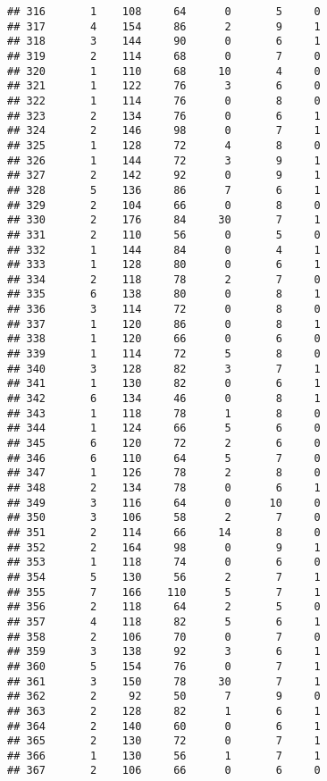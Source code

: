 \documentclass[
]{article}
\begin{document}
\begin{verbatim}
## 316       1    108     64      0       5     0
## 317       4    154     86      2       9     1
## 318       3    144     90      0       6     1
## 319       2    114     68      0       7     0
## 320       1    110     68     10       4     0
## 321       1    122     76      3       6     0
## 322       1    114     76      0       8     0
## 323       2    134     76      0       6     1
## 324       2    146     98      0       7     1
## 325       1    128     72      4       8     0
## 326       1    144     72      3       9     1
## 327       2    142     92      0       9     1
## 328       5    136     86      7       6     1
## 329       2    104     66      0       8     0
## 330       2    176     84     30       7     1
## 331       2    110     56      0       5     0
## 332       1    144     84      0       4     1
## 333       1    128     80      0       6     1
## 334       2    118     78      2       7     0
## 335       6    138     80      0       8     1
## 336       3    114     72      0       8     0
## 337       1    120     86      0       8     1
## 338       1    120     66      0       6     0
## 339       1    114     72      5       8     0
## 340       3    128     82      3       7     1
## 341       1    130     82      0       6     1
## 342       6    134     46      0       8     1
## 343       1    118     78      1       8     0
## 344       1    124     66      5       6     0
## 345       6    120     72      2       6     0
## 346       6    110     64      5       7     0
## 347       1    126     78      2       8     0
## 348       2    134     78      0       6     1
## 349       3    116     64      0      10     0
## 350       3    106     58      2       7     0
## 351       2    114     66     14       8     0
## 352       2    164     98      0       9     1
## 353       1    118     74      0       6     0
## 354       5    130     56      2       7     1
## 355       7    166    110      5       7     1
## 356       2    118     64      2       5     0
## 357       4    118     82      5       6     1
## 358       2    106     70      0       7     0
## 359       3    138     92      3       6     1
## 360       5    154     76      0       7     1
## 361       3    150     78     30       7     1
## 362       2     92     50      7       9     0
## 363       2    128     82      1       6     1
## 364       2    140     60      0       6     1
## 365       2    130     72      0       7     1
## 366       1    130     56      1       7     1
## 367       2    106     66      0       6     0

\end{verbatim}
\end{document}
